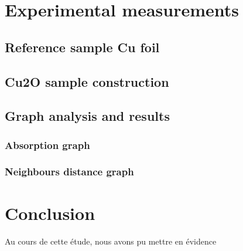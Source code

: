 \documentclass[11pt,a4paper,oneside]{article}
\begin{document}
\newpage



\section{Experimental measurements}
\subsection{Reference sample Cu foil}


\subsection{Cu2O sample construction}


\subsection{Graph analysis and results} \label{results}


\subsubsection{Absorption graph}


\subsubsection{Neighbours distance graph}

 
\newpage

\section*{Conclusion}

Au cours de cette étude, nous avons pu mettre en évidence


\nocite{*}


\end{document}
